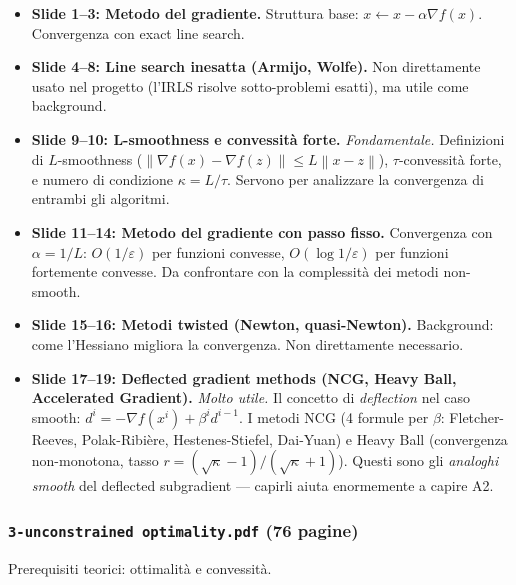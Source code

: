 \documentclass[a4paper,11pt]{article}
\theoremstyle{definition}
\newcommand{\norm}[1]{\left\lVert #1 \right\rVert}
\begin{document}
\begin{itemize}
  \item \textbf{Slide 1--3: Metodo del gradiente.} Struttura base: $x \leftarrow x - \alpha \nabla f(x)$. Convergenza con exact line search.

  \item \textbf{Slide 4--8: Line search inesatta (Armijo, Wolfe).} Non direttamente usato nel progetto (l'IRLS risolve sotto-problemi esatti), ma utile come background.

  \item \textbf{Slide 9--10: L-smoothness e convessità forte.} \emph{Fondamentale.} Definizioni di $L$-smoothness ($\norm{\nabla f(x) - \nabla f(z)} \leq L\norm{x-z}$), $\tau$-convessità forte, e numero di condizione $\kappa = L/\tau$. Servono per analizzare la convergenza di entrambi gli algoritmi.

  \item \textbf{Slide 11--14: Metodo del gradiente con passo fisso.} Convergenza con $\alpha = 1/L$: $O(1/\varepsilon)$ per funzioni convesse, $O(\log 1/\varepsilon)$ per funzioni fortemente convesse. Da confrontare con la complessità dei metodi non-smooth.

  \item \textbf{Slide 15--16: Metodi twisted (Newton, quasi-Newton).} Background: come l'Hessiano migliora la convergenza. Non direttamente necessario.

  \item \textbf{Slide 17--19: Deflected gradient methods (NCG, Heavy Ball, Accelerated Gradient).} \emph{Molto utile.} Il concetto di \emph{deflection} nel caso smooth: $d^i = -\nabla f(x^i) + \beta^i d^{i-1}$. I metodi NCG (4 formule per $\beta$: Fletcher-Reeves, Polak-Ribière, Hestenes-Stiefel, Dai-Yuan) e Heavy Ball (convergenza non-monotona, tasso $r = (\sqrt{\kappa}-1)/(\sqrt{\kappa}+1)$). Questi sono gli \emph{analoghi smooth} del deflected subgradient --- capirli aiuta enormemente a capire A2.
\end{itemize}

\subsubsection*{ \quad \texttt{3-unconstrained optimality.pdf} (76 pagine)}

Prerequisiti teorici: ottimalità e convessità.
\end{document}
